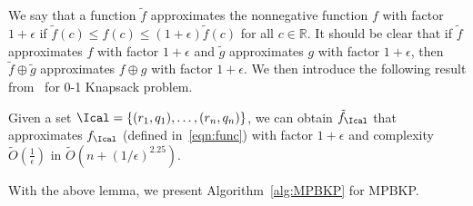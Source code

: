 \documentclass[11pt]{article}
\begin{document}
We say that a function $\tilde{f}$ approximates the nonnegative function $f$ with factor $1+\epsilon$ if $\tilde{f}(c)\le f(c)\le (1+\epsilon)\tilde{f}(c)$ for all $c\in\mathbb{R}$. It should be clear that if $\tilde{f}$ approximates $f$ with factor $1+\epsilon$ and $\tilde{g}$ approximates $g$ with factor $1+\epsilon$, then $\tilde{f}\oplus\tilde{g}$ approximates $f\oplus g$ with factor $1+\epsilon$. We then introduce the following result from~\cite{jin:LIPIcs:2019:10652} for 0-1 Knapsack problem. 
\begin{lemma}\label{lem:01}
Given a set $\Ical=\{(r_1,q_1),\ldots,(r_n,q_n)\}$, we can obtain $\tilde{f}_{\Ical}$ that approximates $f_\Ical$ (defined in~\eqref{eqn:func}) with factor $1+\epsilon$ and complexity $\tilde{O}\left(\frac{1}{\epsilon}\right)$ in $\tilde{O}\left(n+\left(1/\epsilon\right)^{2.25}\right)$.
\end{lemma}
With the above lemma, we present Algorithm~\ref{alg:MPBKP} for MPBKP.
\end{document}
